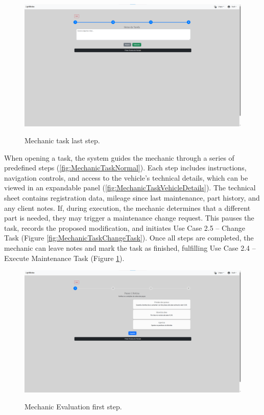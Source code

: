 \begin{figure}[h]
  \caption{Mechanic task last step.}
  \centering
  \includegraphics[width=\textwidth]{figs/Implementation/mechanic/MechanicTaskLastStep}
  \label{fig:MechanicTaskLastStep}
\end{figure}


When opening a task, the system guides the mechanic through a series of predefined steps (\ref{fig:MechanicTaskNormal}). Each step includes instructions, navigation controls, and access to the vehicle's technical details, which can be viewed in an expandable panel (\ref{fig:MechanicTaskVehicleDetails}). The technical sheet contains registration data, mileage since last maintenance, part history, and any client notes. If, during execution, the mechanic determines that a different part is needed, they may trigger a maintenance change request. This pauses the task, records the proposed modification, and initiates Use Case 2.5 – Change Task (Figure \ref{fig:MechanicTaskChangeTask}). Once all steps are completed, the mechanic can leave notes and mark the task as finished, fulfilling Use Case 2.4 – Execute Maintenance Task (Figure \ref{fig:MechanicTaskLastStep}).




\begin{figure}[h]
  \caption{Mechanic Evaluation first step.}
  \centering
  \includegraphics[width=\textwidth]{figs/Implementation/mechanic/MechanicEvaluationNormal}
  \label{fig:MechanicEvaluationNormal}
\end{figure}



